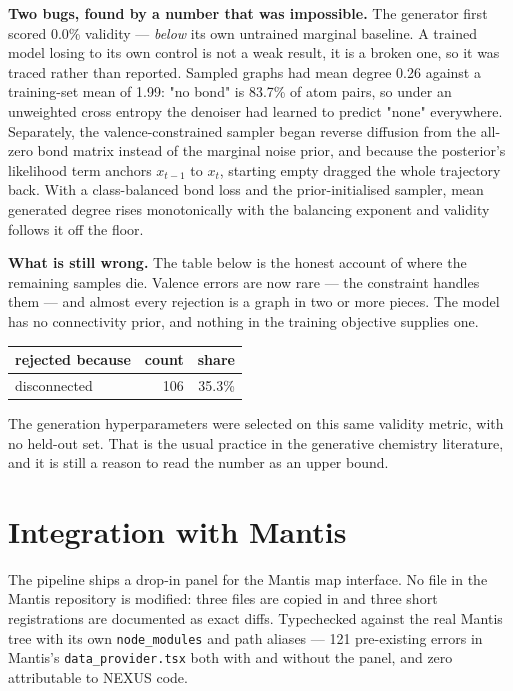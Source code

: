 \documentclass[11pt]{article}
\begin{document}
\textbf{Two bugs, found by a number that was impossible.} The generator first scored
0.0\% validity --- \emph{below} its own untrained marginal baseline. A trained model
losing to its own control is not a weak result, it is a broken one, so it was traced
rather than reported. Sampled graphs had mean degree 0.26 against a training-set mean of
1.99: "no bond" is 83.7\% of atom pairs, so under an unweighted cross entropy the
denoiser had learned to predict "none" everywhere. Separately, the valence-constrained
sampler began reverse diffusion from the all-zero bond matrix instead of the marginal
noise prior, and because the posterior's likelihood term anchors $x_{t-1}$ to $x_t$,
starting empty dragged the whole trajectory back. With a class-balanced bond loss and the
prior-initialised sampler, mean generated degree rises monotonically with the balancing
exponent and validity follows it off the floor.

\textbf{What is still wrong.} The table below is the honest account of where the
remaining samples die. Valence errors are now rare --- the constraint handles them --- and
almost every rejection is a graph in two or more pieces. The model has no connectivity
prior, and nothing in the training objective supplies one.

\begin{tabular}{lrr}
\toprule
rejected because & count & share \\
\midrule
disconnected & 106 & 35.3\% \\
\bottomrule
\end{tabular}


\noindent\footnotesize The generation hyperparameters were selected on this same
validity metric, with no held-out set. That is the usual practice in the generative
chemistry literature, and it is still a reason to read the number as an upper bound.
\normalsize

\section{Integration with Mantis}

The pipeline ships a drop-in panel for the Mantis map interface. No file in the Mantis
repository is modified: three files are copied in and three short registrations are
documented as exact diffs. Typechecked against the real Mantis tree with its own
\texttt{node\_modules} and path aliases --- 121 pre-existing errors in Mantis's
\texttt{data\_provider.tsx} both with and without the panel, and zero attributable to
NEXUS code.
\end{document}
